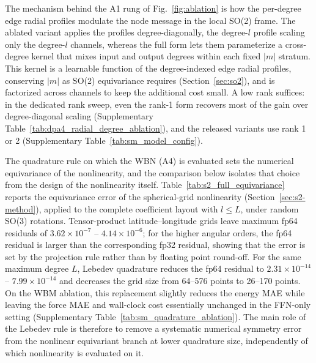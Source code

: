 The mechanism behind the A1 rung of Fig.~\ref{fig:ablation} is how the per-degree edge radial profiles modulate the node message in the local SO(2) frame.
The ablated variant applies the profiles degree-diagonally, the degree-$l$ profile scaling only the degree-$l$ channels, whereas the full form lets them parameterize a cross-degree kernel that mixes input and output degrees within each fixed $|m|$ stratum.
This kernel is a learnable function of the degree-indexed edge radial profiles, conserving $|m|$ as SO(2) equivariance requires (Section~\ref{sec:so2}), and is factorized across channels to keep the additional cost small.
A low rank suffices: in the dedicated rank sweep, even the rank-1 form recovers most of the gain over degree-diagonal scaling (Supplementary Table~\ref{tab:dpa4_radial_degree_ablation}), and the released variants use rank 1 or 2 (Supplementary Table~\ref{tab:sm_model_config}).

The quadrature rule on which the WBN (A4) is evaluated sets the numerical equivariance of the nonlinearity, and the comparison below isolates that choice from the design of the nonlinearity itself.
Table~\ref{tab:s2_full_equivariance} reports the equivariance error of the spherical-grid nonlinearity (Section~\ref{sec:s2-method}), applied to the complete coefficient layout with $l\le L$, under random SO(3) rotations.
Tensor-product latitude--longitude grids leave maximum fp64 residuals of $3.62\times10^{-7}$ -- $4.14\times10^{-6}$; for the higher angular orders, the fp64 residual is larger than the corresponding fp32 residual, showing that the error is set by the projection rule rather than by floating point round-off.
For the same maximum degree $L$, Lebedev quadrature reduces the fp64 residual to $2.31\times10^{-14}$ -- $7.99\times10^{-14}$ and decreases the grid size from 64--576 points to 26--170 points.
On the WBM ablation, this replacement slightly reduces the energy MAE while leaving the force MAE and wall-clock cost essentially unchanged in the FFN-only setting (Supplementary Table~\ref{tab:sm_quadrature_ablation}).
The main role of the Lebedev rule is therefore to remove a systematic numerical symmetry error from the nonlinear equivariant branch at lower quadrature size, independently of which nonlinearity is evaluated on it.

